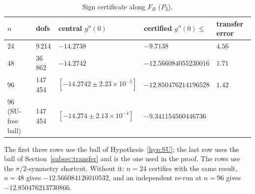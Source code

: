 \documentclass[11pt]{amsart}
\theoremstyle{definition}
\theoremstyle{remark}
\newcommand{\FB}{F_B}
\begin{document}
\begin{table}[!htbp]
\caption{Certificate for $A\ne0$ (per unit $t$, $m(u)$ normalised to $1$). The $n=48$ row fails to
certify.}\label{tab:Anonzero}
\small
{}
\end{table}

\begin{table}[!htbp]
\caption{Sign certificate along $\FB$ ($P_2$).}\label{tab:sign}
\small
\begin{tabular}{@{}lllll@{}}
\toprule
$n$ & dofs & central $g''(0)$ & certified $g''(0)\le$ & transfer error\\
\midrule
24 & 9\,214 & $-14.2738$ & $-9.7138$ & $4.56$\\
48 & 36\,862 & $-14.2742$ & $-12.566084055230016$ & $1.71$\\
96 & 147\,454 & $[-14.2742\pm2.23\times10^{-5}]$ & $-12.850476214196528$ & $1.42$\\
\midrule
96 (SU-free ball) & 147\,454 & $[-14.274\pm2.13\times10^{-4}]$ & $-9.341154560446736$ & \\
\bottomrule
\end{tabular}

\medskip
\parbox{0.9\textwidth}{\footnotesize The first three rows use the ball of Hypothesis~\ref{hyp:SU};
the last row uses the ball of Section~\ref{subsec:transfer} and is the one used in the proof. The rows use the $\pi/2$-symmetry shortcut. Without it:
$n=24$ certifies with the same result, $n=48$ gives $-12.566084126010532$, and an independent re-run
at $n=96$ gives $-12.850476213730866$.}
\end{table}
\end{document}
